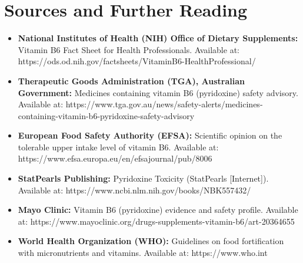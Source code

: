 \section*{Sources and Further Reading}
\begin{itemize}
    \item \textbf{National Institutes of Health (NIH) Office of Dietary Supplements:} Vitamin B6 Fact Sheet for Health Professionals. Available at: https://ods.od.nih.gov/factsheets/VitaminB6-HealthProfessional/
    \item \textbf{Therapeutic Goods Administration (TGA), Australian Government:} Medicines containing vitamin B6 (pyridoxine) safety advisory. Available at: https://www.tga.gov.au/news/safety-alerts/medicines-containing-vitamin-b6-pyridoxine-safety-advisory
    \item \textbf{European Food Safety Authority (EFSA):} Scientific opinion on the tolerable upper intake level of vitamin B6. Available at: https://www.efsa.europa.eu/en/efsajournal/pub/8006
    \item \textbf{StatPearls Publishing:} Pyridoxine Toxicity (StatPearls [Internet]). Available at: https://www.ncbi.nlm.nih.gov/books/NBK557432/
    \item \textbf{Mayo Clinic:} Vitamin B6 (pyridoxine) evidence and safety profile. Available at: https://www.mayoclinic.org/drugs-supplements-vitamin-b6/art-20364655
    \item \textbf{World Health Organization (WHO):} Guidelines on food fortification with micronutrients and vitamins. Available at: https://www.who.int
\end{itemize}